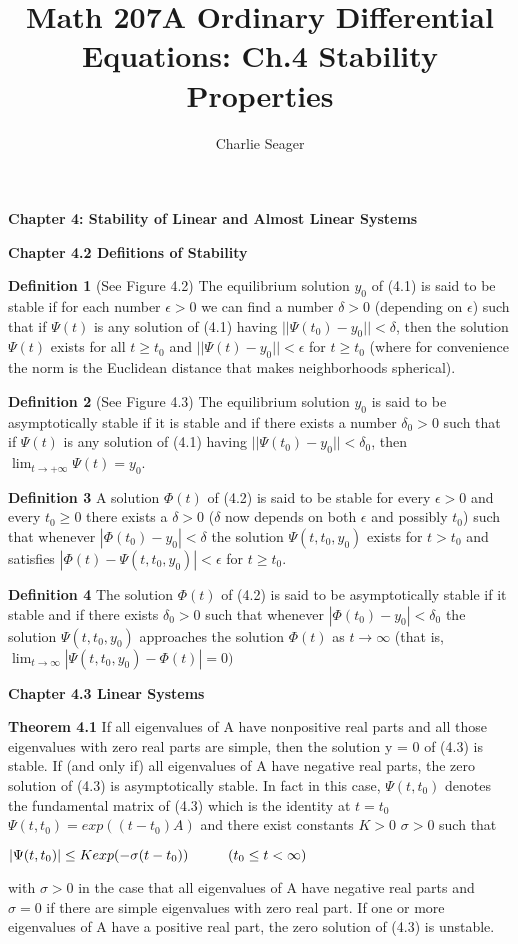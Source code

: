 \documentclass{article}
\newcommand\tab[1][1cm]{\hspace*{#1}}
\begin{document}
\title {Math 207A Ordinary Differential Equations: Ch.4 Stability Properties}

\author{Charlie Seager}

\maketitle

\textbf {Chapter 4: Stability of Linear and Almost Linear Systems}

\textbf {Chapter 4.2 Defiitions of Stability}

\textbf {Definition 1} (See Figure 4.2) The equilibrium solution $y_0$ of (4.1) is said to be stable if for each number $\epsilon > 0$ we can find a number $\delta > 0$ (depending on $\epsilon$) such that if $\Psi(t)$ is any solution of (4.1) having $||\Psi(t_0) - y_0|| < \delta$, then the solution $\Psi(t)$ exists for all $t \geq t_0$ and $||\Psi(t) - y_0||< \epsilon$ for $t \geq t_0$ (where for convenience the norm is the Euclidean distance that makes neighborhoods spherical).

\textbf {Definition 2} (See Figure 4.3) The equilibrium solution $y_0$ is said to be asymptotically stable if it is stable and if there exists a number $\delta_0 > 0$ such that if $\Psi(t)$ is any solution of (4.1) having $||\Psi(t_0) - y_0||< \delta_0$, then $\lim_{t \to + \infty} \Psi(t) = y_0$.

\textbf {Definition 3} A solution $\Phi(t)$ of (4.2) is said to be stable for every $\epsilon > 0$ and every $t_0 \geq 0$ there exists a $\delta > 0$ ($\delta$ now depends on both $\epsilon$ and possibly $t_0$) such that whenever $|\Phi(t_0)-y_0| < \delta$ the solution $\Psi(t, t_0, y_0)$ exists for $t > t_0$ and satisfies $|\Phi(t) - \Psi(t, t_0, y_0)| < \epsilon$ for $t \geq t_0$.

\textbf {Definition 4} The solution $\Phi(t)$ of (4.2) is said to be asymptotically stable if it stable and if there exists $\delta_0 > 0$ such that whenever $|\Phi(t_0) - y_0| < \delta_0$ the solution $\Psi(t, t_0, y_0)$ approaches the solution $\Phi(t)$ as $t \to \infty$ (that is, $\lim_{t \to \infty} | \Psi(t, t_0, y_0) - \Phi(t)| = 0)$

\textbf {Chapter 4.3 Linear Systems}

\textbf {Theorem 4.1} If all eigenvalues of A have nonpositive real parts and all those eigenvalues with zero real parts are simple, then the solution y = 0 of (4.3) is stable. If (and only if) all eigenvalues of A have negative real parts, the zero solution of (4.3) is asymptotically stable. In fact in this case, $\Psi(t, t_0)$ denotes the fundamental matrix of (4.3) which is the identity at $t = t_0$ $\Psi(t, t_0) = exp ((t-t_0)A)$ and there exist constants $K > 0$ $\sigma > 0$ such that
\begin{center}
$| \Psi(t, t_0)| \leq K exp (-\sigma(t-t_0)) \tab (t_0 \leq t < \infty)$
\end{center}
with $\sigma > 0$ in the case that all eigenvalues of A have negative real parts and $\sigma = 0$ if there are simple eigenvalues with zero real part. If one or more eigenvalues of A have a positive real part, the zero solution of (4.3) is unstable.
\end{document}
